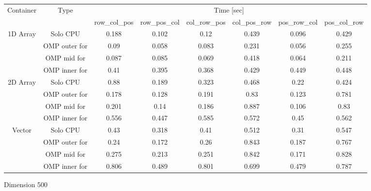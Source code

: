 \begin{tabular}{ |c|c|c|c|c|c|c|c|  }
\hline 
\multirow{2}{*}{Container}  & \multirow{2}{*}{Type} & \multicolumn{6}{c|}{ Time [sec] } \\  \cline{3-8}

                          & & row\_col\_pos & row\_pos\_col & col\_row\_pos & col\_pos\_row  & pos\_row\_col & pos\_col\_row \\
\hline 
\multirow{4}{*}{1D Array}   & Solo CPU      & 0.188 &0.102 &0.12 &0.439 &0.096 &0.429 \\
                            & OMP outer for & 0.09 &0.058 &0.083 &0.231 &0.056 &0.255 \\
                            & OMP mid for   & 0.087 &0.085 &0.069 &0.418 &0.064 &0.211 \\
                            & OMP inner for & 0.41 &0.395 &0.368 &0.429 &0.449 &0.448 \\

\hline 
\multirow{4}{*}{2D Array}  
                            & Solo CPU      & 0.88  & 0.189 &0.323 &0.468 &0.22 &0.424 \\
                            & OMP outer for & 0.178 & 0.128 &0.191 &0.83 &0.123 &0.781 \\
                            & OMP mid for   & 0.201 & 0.14 &0.186 &0.887 &0.106 &0.83 \\
                            & OMP inner for & 0.556 & 0.447 &0.585 &0.572 &0.45 &0.562 \\

\hline 
\multirow{4}{*}{Vector}     
                            & Solo CPU      & 0.43 &0.318 &0.41 &0.512 &0.31 &0.547 \\                           
                            & OMP outer for & 0.24 &0.172 &0.26 &0.843 &0.187 &0.767 \\
                            & OMP mid for   & 0.275 &0.213 &0.251 &0.842 &0.171 &0.828 \\
                            & OMP inner for & 0.806 &0.489 &0.801 &0.699 &0.479 &0.787 \\  
\hline
\end{tabular}
\caption{ Dimension 500 }
\label{table2ntb}
